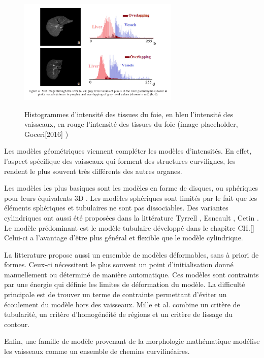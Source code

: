 \begin{figure}
  \centering
  \includegraphics[height=5cm]{Images/Goceri[2016].png}
  \label{fig:overlap_vessels_tissues}
  \caption{Histogrammes d'intensité des tissues du foie, en bleu l'intensité des vaisseaux, en rouge l'intensité des tissues du foie (image placeholder, Goceri[2016] ) }
\end{figure}

Les modèles géométriques viennent compléter les modèles d'intensités. En effet, l'aspect spécifique des vaisseaux qui forment des structures curvilignes, les rendent le plus souvent très différents des autres organes.

Les modèles les plus basiques sont les modèles en forme de disques, ou sphériques pour leurs équivalents 3D \cite{Law2008_OOF}. Les modèles sphériques sont limités par le fait que les éléments sphériques et tubulaires ne sont pas dissociables. Des variantes cylindriques ont aussi été proposées dans la littérature Tyrrell \cite{tyrrell2007_superEllipoid}, Esneault \cite{Esneault2009_moments_graph_cut}, Cetin \cite{Cetin2015_high_order}. Le modèle prédominant est le modèle tubulaire  développé dans le chapitre CH.\ref{} Celui-ci a l'avantage d'être plus général et flexible que le modèle cylindrique.

La litterature propose aussi un ensemble de modèles déformables, sans à priori de formes. Ceux-ci nécessitent le plus souvent un point d'initialisation donné manuellement ou déterminé de manière automatique. Ces modèles sont contraints par une énergie qui définie les limites de déformation du modèle. La difficulté principale est de trouver un terme de contrainte permettant d'éviter un écoulement du modèle hors des vaisseaux. Mille et al. \cite{Mille2009_deformable} combine un critère de tubularité, un critère d'homogénéité de régions et un critère de lissage du contour. 

Enfin, une famille de modèle provenant de la morphologie mathématique modélise les vaisseaux comme un ensemble de chemins curvilinéaires.\cite{Heijmans2005_path_opening}

